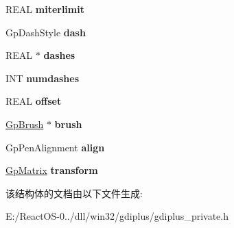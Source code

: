 \begin{DoxyCompactItemize}
R\+E\+AL {\bfseries miterlimit}
\item 
\mbox{\label{struct_gp_pen_a00fe851941381c8ecf0649bd73feb532}} 
Gp\+Dash\+Style {\bfseries dash}
\item 
\mbox{\label{struct_gp_pen_a231eaf52853e335945c6c74357d0f2cf}} 
R\+E\+AL $\ast$ {\bfseries dashes}
\item 
\mbox{\label{struct_gp_pen_a0c8adfec8cef2c965e4b1da064ddcb84}} 
I\+NT {\bfseries numdashes}
\item 
\mbox{\label{struct_gp_pen_a7e079338bad7e530d2e72cb4ba08f6ee}} 
R\+E\+AL {\bfseries offset}
\item 
\mbox{\label{struct_gp_pen_ae6f6f3ef1ff54a928db843addef8246d}} 
\hyperlink{struct_gp_brush}{Gp\+Brush} $\ast$ {\bfseries brush}
\item 
\mbox{\label{struct_gp_pen_af2f7aedfe94d749f7a6b9e0abc49bb0d}} 
Gp\+Pen\+Alignment {\bfseries align}
\item 
\mbox{\label{struct_gp_pen_a7db32dc2240753fd2c88800089b5b4a4}} 
\hyperlink{struct_gp_matrix}{Gp\+Matrix} {\bfseries transform}
\end{DoxyCompactItemize}


该结构体的文档由以下文件生成\+:\begin{DoxyCompactItemize}
\item 
E\+:/\+React\+O\+S-\/0../dll/win32/gdiplus/gdiplus\+\_\+private.\+h\end{DoxyCompactItemize}
